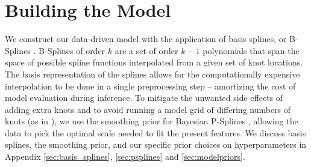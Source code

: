 \section{Building the Model} \label{sec:methods}

We construct our data-driven model with the application of basis splines, or B-Splines \citep{deBoor78}. B-Splines of order $k$ are a set of order $k-1$ polynomials that 
span the space of possible spline functions interpolated from a given set of knot locations. The basis representation of the splines allows for the computationally
expensive interpolation to be done in a single preprocessing step -- amortizing the cost of model evaluation during inference. To mitigate the unwanted side effects of 
adding extra knots and to avoid running a model grid of differing numbers of knots (as in \citet{Edelman_2022ApJ}), we use the smoothing prior for Bayesian P-Splines \citep{eilers2021practical,BayesianPSplines,Jullion2007RobustSO}, 
allowing the data to pick the optimal scale needed to fit the present features. We discuss basis splines, the smoothing prior, and our specific prior choices on hyperparameters in Appendix \ref{sec:basis_splines}, \ref{sec:psplines} and \ref{sec:modelpriors}.

